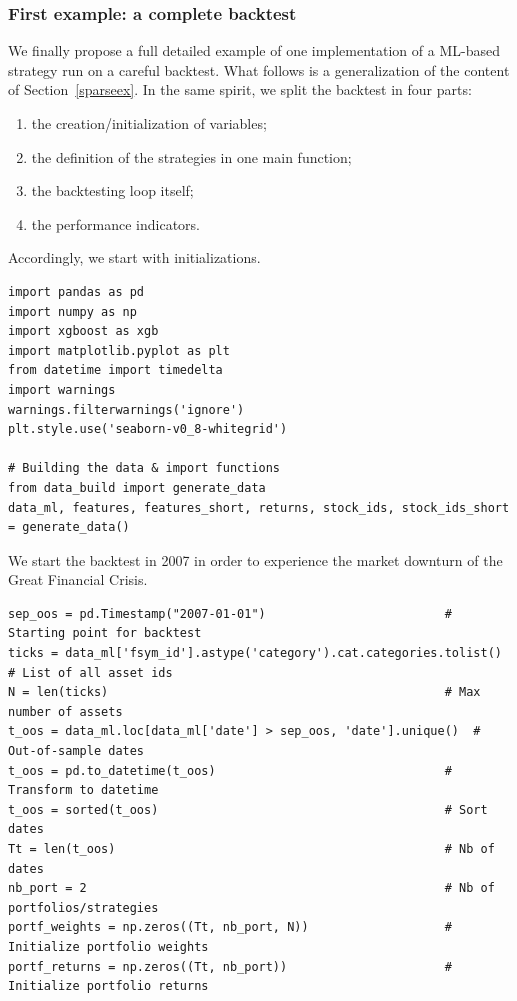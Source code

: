 \subsubsection{First example: a complete backtest}

We finally propose a full detailed example of one implementation of a ML-based strategy run on a careful backtest.
What follows is a generalization of the content of Section~\ref{sparseex}. In the same spirit, we split the backtest in four parts:

\begin{enumerate}
\item the creation/initialization of variables;
\item the definition of the strategies in one main function;
\item the backtesting loop itself;
\item the performance indicators.
\end{enumerate}

Accordingly, we start with initializations.

\begin{verbatim}
import pandas as pd
import numpy as np
import xgboost as xgb
import matplotlib.pyplot as plt
from datetime import timedelta
import warnings
warnings.filterwarnings('ignore')
plt.style.use('seaborn-v0_8-whitegrid')

# Building the data & import functions
from data_build import generate_data
data_ml, features, features_short, returns, stock_ids, stock_ids_short = generate_data()
\end{verbatim}

We start the backtest in 2007 in order to experience the market downturn of the Great Financial Crisis.

\begin{verbatim}
sep_oos = pd.Timestamp("2007-01-01")                         # Starting point for backtest
ticks = data_ml['fsym_id'].astype('category').cat.categories.tolist()  # List of all asset ids
N = len(ticks)                                               # Max number of assets
t_oos = data_ml.loc[data_ml['date'] > sep_oos, 'date'].unique()  # Out-of-sample dates
t_oos = pd.to_datetime(t_oos)                                # Transform to datetime
t_oos = sorted(t_oos)                                        # Sort dates
Tt = len(t_oos)                                              # Nb of dates
nb_port = 2                                                  # Nb of portfolios/strategies
portf_weights = np.zeros((Tt, nb_port, N))                   # Initialize portfolio weights
portf_returns = np.zeros((Tt, nb_port))                      # Initialize portfolio returns
\end{verbatim}

